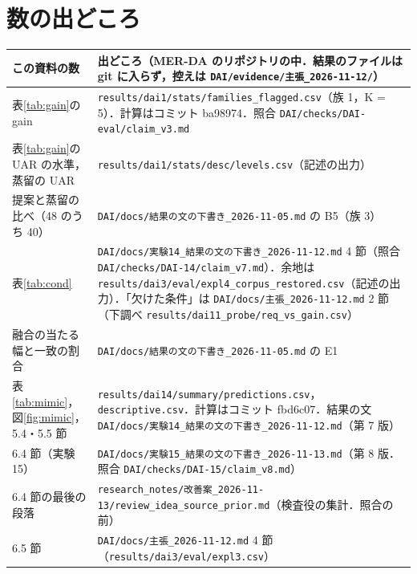 \documentclass[a4paper,11pt]{ltjsarticle}
\begin{document}
\section{数の出どころ}
\begin{center}
\footnotesize
\begin{tabular}{>{\raggedright}p{4.0cm}>{\raggedright\arraybackslash}p{10.3cm}}
\toprule
この資料の数 & 出どころ（MER-DA のリポジトリの中．結果のファイルは git に入らず，控えは \texttt{DAI/evidence/主張\_2026-11-12/}） \\
\midrule
表\ref{tab:gain}の gain & \texttt{results/dai1/stats/families\_flagged.csv}（族 1，K = 5）．計算はコミット ba98974．照合 \texttt{DAI/checks/DAI-eval/claim\_v3.md} \\
表\ref{tab:gain}の UAR の水準，蒸留の UAR & \texttt{results/dai1/stats/desc/levels.csv}（記述の出力） \\
提案と蒸留の比べ（48 のうち 40） & \texttt{DAI/docs/結果の文の下書き\_2026-11-05.md} の B5（族 3） \\
表\ref{tab:cond} & \texttt{DAI/docs/実験14\_結果の文の下書き\_2026-11-12.md} 4 節（照合 \texttt{DAI/checks/DAI-14/claim\_v7.md}）．余地は \texttt{results/dai3/eval/expl4\_corpus\_restored.csv}（記述の出力）．「欠けた条件」は \texttt{DAI/docs/主張\_2026-11-12.md} 2 節（下調べ \texttt{results/dai11\_probe/req\_vs\_gain.csv}） \\
融合の当たる幅と一致の割合 & \texttt{DAI/docs/結果の文の下書き\_2026-11-05.md} の E1 \\
表\ref{tab:mimic}，図\ref{fig:mimic}，5.4・5.5 節 & \texttt{results/dai14/summary/predictions.csv}，\texttt{descriptive.csv}．計算はコミット fbd6c07．結果の文 \texttt{DAI/docs/実験14\_結果の文の下書き\_2026-11-12.md}（第 7 版） \\
6.4 節（実験 15） & \texttt{DAI/docs/実験15\_結果の文の下書き\_2026-11-13.md}（第 8 版．照合 \texttt{DAI/checks/DAI-15/claim\_v8.md}） \\
6.4 節の最後の段落 & \texttt{research\_notes/改善案\_2026-11-13/review\_idea\_source\_prior.md}（検査役の集計．照合の前） \\
6.5 節 & \texttt{DAI/docs/主張\_2026-11-12.md} 4 節（\texttt{results/dai3/eval/expl3.csv}） \\
\bottomrule
\end{tabular}
\end{center}
\end{document}
